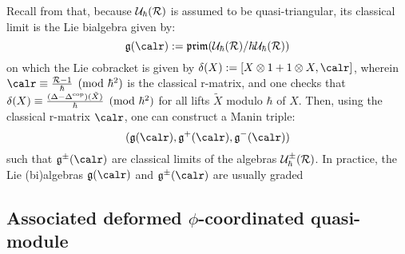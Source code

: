         Recall from \cite{etingof_kazhdan_quantisation_1} that, because $\mathcal{U}_{\hbar}(\mathcal{R})$ is assumed to be quasi-triangular, its classical limit is the Lie bialgebra given by:
            $$\g(\calr) := \prim( \calU_{\hbar}(\calR)/\hbar \calU_{\hbar}(\calR) )$$
        on which the Lie cobracket is given by $\delta(X) := [X \tensor 1 + 1 \tensor X, \calr]$, wherein $\calr \equiv \frac{\calR - 1}{\hbar} \pmod{\hbar^2}$ is the classical r-matrix, and one checks that $\delta(X) \equiv \frac{(\Delta - \Delta^{\mathrm{cop}})(\tilde{X})}{\hbar} \pmod{\hbar^2}$ for all lifts $\tilde{X}$ modulo $\hbar$ of $X$. Then, using the classical r-matrix $\calr$, one can construct a Manin triple:
            $$( \g(\calr), \g^+(\calr), \g^-(\calr) )$$
        such that $\g^{\pm}(\calr)$ are classical limits of the algebras $\mathcal{U}_{\hbar}^{\pm}(\mathcal{R})$. In practice, the Lie (bi)algebras $\g(\calr)$ and $\g^{\pm}(\calr)$ are usually graded

    \subsection{\texorpdfstring{Associated deformed $\phi$-coordinated quasi-module}{}}
